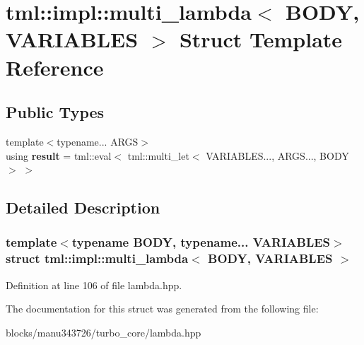 \hypertarget{structtml_1_1impl_1_1multi__lambda}{\section{tml\+:\+:impl\+:\+:multi\+\_\+lambda$<$ B\+O\+D\+Y, V\+A\+R\+I\+A\+B\+L\+E\+S $>$ Struct Template Reference}
\label{structtml_1_1impl_1_1multi__lambda}
}
\subsection*{Public Types}
\begin{DoxyCompactItemize}
\item 
\hypertarget{structtml_1_1impl_1_1multi__lambda_aee819de14873162d61351d43f02d7479}{{\footnotesize template$<$typename... A\+R\+G\+S$>$ }\\using {\bfseries result} = tml\+::eval$<$ tml\+::multi\+\_\+let$<$ V\+A\+R\+I\+A\+B\+L\+E\+S..., A\+R\+G\+S..., B\+O\+D\+Y $>$ $>$}\label{structtml_1_1impl_1_1multi__lambda_aee819de14873162d61351d43f02d7479}

\end{DoxyCompactItemize}


\subsection{Detailed Description}
\subsubsection*{template$<$typename B\+O\+D\+Y, typename... V\+A\+R\+I\+A\+B\+L\+E\+S$>$struct tml\+::impl\+::multi\+\_\+lambda$<$ B\+O\+D\+Y, V\+A\+R\+I\+A\+B\+L\+E\+S $>$}



Definition at line 106 of file lambda.\+hpp.



The documentation for this struct was generated from the following file\+:\begin{DoxyCompactItemize}
\item 
blocks/manu343726/turbo\+\_\+core/lambda.\+hpp\end{DoxyCompactItemize}

